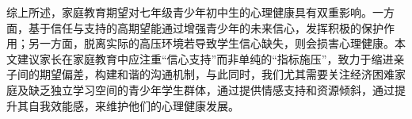\documentclass[zihao = -4, linespread = 1.5]{article}
\begin{document}
\vspace*{1em}

综上所述，家庭教育期望对七年级青少年初中生的心理健康具有双重影响。一方面，基于信任与支持的高期望能通过增强青少年的未来信心，发挥积极的保护作用；另一方面，脱离实际的高压环境若导致学生信心缺失，则会损害心理健康。本文建议家长在家庭教育中应注重“信心支持”而非单纯的“指标施压”，致力于缩进亲子间的期望偏差，构建和谐的沟通机制，与此同时，我们尤其需要关注经济困难家庭及缺乏独立学习空间的青少年学生群体，通过提供情感支持和资源倾斜，通过提升其自我效能感，来维护他们的心理健康发展。












\clearpage
\cfoot{}
\setlength{\bibhang}{2em}
\renewcommand{\refname}{}
\centerline{\bfseries{}}
\vspace*{-3em}
\end{document}
